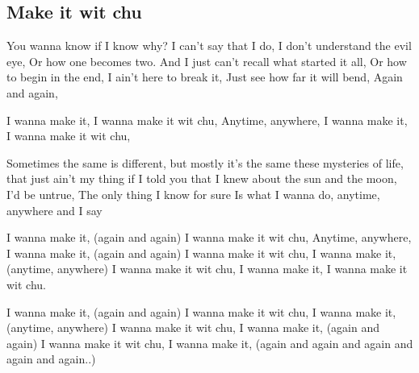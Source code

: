 \subsection*{Make it wit chu   }
\begin{guitar}

You wanna know if I know why?
I can't say that I do,
I don't understand the evil eye,
Or how one becomes two.
And I just can't recall what started it all,
Or how to begin in the end,
I ain't here to break it,
Just see how far it will bend,
Again and again,

I wanna make it,
I wanna make it wit chu,
Anytime, anywhere,
I wanna make it,
I wanna make it wit chu,

Sometimes the same is different,
but mostly it's the same
these mysteries of life, that just ain't my thing
if I told you that I knew about the sun and the moon,
I'd be untrue,
The only thing I know for sure
Is what I wanna do,
anytime, anywhere and I say

I wanna make it, (again and again)
I wanna make it wit chu,
Anytime, anywhere,
I wanna make it, (again and again)
I wanna make it wit chu,
I wanna make it, (anytime, anywhere)
I wanna make it wit chu,
I wanna make it,
I wanna make it wit chu.

I wanna make it, (again and again)
I wanna make it wit chu,
I wanna make it, (anytime, anywhere)
I wanna make it wit chu,
I wanna make it, (again and again)
I wanna make it wit chu,
I wanna make it, (again and again and again and again and again..) 
\end{guitar}
